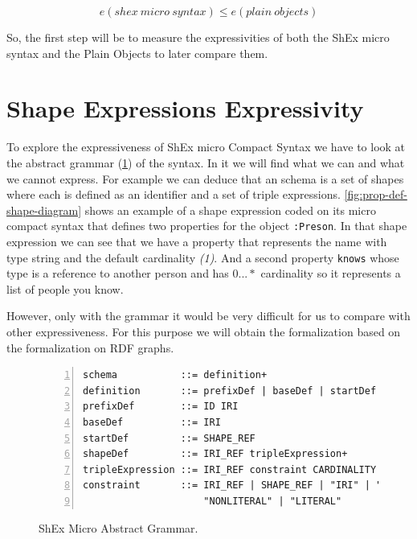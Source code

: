 \begin{equation} \label{eq:expressivity-question}
    e(shex\ micro\ syntax) \leq e(plain\ objects)
\end{equation}

So, the first step will be to measure the expressivities of both the ShEx micro syntax and the Plain Objects to later
compare them.


\section{Shape Expressions Expressivity}
To explore the expressiveness of ShEx micro Compact Syntax we have to look
at the abstract grammar (\cref{fig:shex-micro-abstract-grammar}) of the syntax.
In it we will find what we can and what we cannot express. For example we can
deduce that an schema is a set of shapes where each is defined as an identifier
and a set of triple expressions. \cref{fig:prop-def-shape-diagram} shows an example
of a shape expression coded on its micro compact syntax that defines two properties
for the object \texttt{:Preson}. In that shape expression we can see that we have a
property that represents the name with type string and the default cardinality \textit{(1)}.
And a second property \texttt{knows} whose type is a reference to another person
and has $0...*$ cardinality so it represents a list of people you know.

However, only with the grammar it would be very difficult
for us to compare with other expressiveness. For this purpose we will obtain the formalization
based on the \cite{milutinovic2019exploring} formalization on RDF graphs.

\begin{figure}
\begin{lstlisting}[numbers=left,basicstyle=\ttfamily\small]
schema           ::= definition+
definition       ::= prefixDef | baseDef | startDef | shapeDef
prefixDef        ::= ID IRI
baseDef          ::= IRI
startDef         ::= SHAPE_REF
shapeDef         ::= IRI_REF tripleExpression+
tripleExpression ::= IRI_REF constraint CARDINALITY
constraint       ::= IRI_REF | SHAPE_REF | "IRI" | "BNODE" |
                     "NONLITERAL" | "LITERAL"
\end{lstlisting}
\caption[ShEx Micro Abstract Grammar]{ShEx Micro Abstract Grammar.}
\label{fig:shex-micro-abstract-grammar}
\end{figure}

